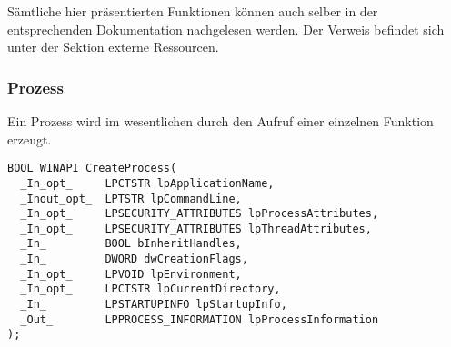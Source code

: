 \documentclass[a4paper]{book}
\begin{document}
\noindent Sämtliche hier präsentierten Funktionen können auch selber in der entsprechenden Dokumentation nachgelesen werden. Der Verweis befindet sich unter der Sektion externe Ressourcen.

\subsubsection{Prozess}
Ein Prozess wird im wesentlichen durch den Aufruf einer einzelnen Funktion erzeugt.

\lstset{language=[Visual]C++}
\begin{lstlisting}[caption={CreateProcess},frame=single]
BOOL WINAPI CreateProcess(
  _In_opt_     LPCTSTR lpApplicationName,
  _Inout_opt_  LPTSTR lpCommandLine,
  _In_opt_     LPSECURITY_ATTRIBUTES lpProcessAttributes,
  _In_opt_     LPSECURITY_ATTRIBUTES lpThreadAttributes,
  _In_         BOOL bInheritHandles,
  _In_         DWORD dwCreationFlags,
  _In_opt_     LPVOID lpEnvironment,
  _In_opt_     LPCTSTR lpCurrentDirectory,
  _In_         LPSTARTUPINFO lpStartupInfo,
  _Out_        LPPROCESS_INFORMATION lpProcessInformation
);
\end{lstlisting}
\end{document}
